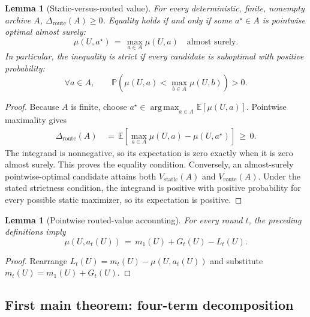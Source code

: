 \documentclass{article} %
\newtheorem{lemma}[theorem]{Lemma}
\begin{document}
\begin{lemma}[Static-versus-routed value]
\label{lem:1}
For every deterministic, finite, nonempty archive \(A\),
\(\Delta_{\mathrm{route}}(A)\geq0\).  Equality holds if and only if some
\(a^\star\in A\) is pointwise optimal almost surely:
\begin{equation}
\mu(U,a^\star)
\,=\,
\max_{a\in A}\mu(U,a)
\quad
\text{almost surely}.
\end{equation}
In particular, the inequality is strict if every candidate is suboptimal with
positive probability:
\begin{equation}
\forall a\in A,
\qquad
\mathbb{P}\!\left(
\mu(U,a)
<
\max_{b\in A}\mu(U,b)
\right)
>
0.
\end{equation}
\end{lemma}

\begin{proof}
Because \(A\) is finite, choose
\(a^\star\in\operatorname*{arg\,max}_{a\in A}
\mathbb E[\mu(U,a)]\).  Pointwise maximality gives
\begin{equation}
\begin{aligned}
\Delta_{\mathrm{route}}(A)
&\,=\,\mathbb E\!\left[
  \max_{a\in A}\mu(U,a)-\mu(U,a^\star)\right]
\,\geq\,0.
\end{aligned}
\end{equation}
The integrand is nonnegative, so its expectation is zero exactly when it is
zero almost surely.  This proves the equality condition.  Conversely, an
almost-surely pointwise-optimal candidate attains both
\(V_{\mathrm{static}}(A)\) and \(V_{\mathrm{route}}(A)\).  Under the stated
strictness condition, the integrand is positive with positive probability for
every possible static maximizer, so its expectation is positive.
\end{proof}

\begin{lemma}[Pointwise routed-value accounting]
\label{lem:2}
For every round \(t\), the preceding definitions imply
\begin{equation}
\mu(U,a_t(U))
\,=\,
m_1(U)+G_t(U)-L_t(U).
\end{equation}
\end{lemma}

\begin{proof}
Rearrange \(L_t(U)=m_t(U)-\mu(U,a_t(U))\) and substitute
\(m_t(U)=m_1(U)+G_t(U)\).
\end{proof}

\subsection{First main theorem: four-term decomposition}
\end{document}
